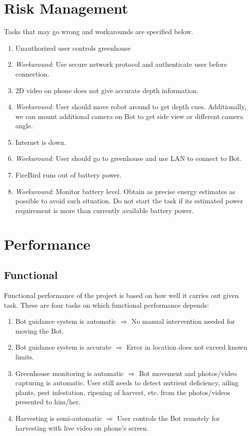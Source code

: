 \documentclass[a4paper, 12pt]{article}
\begin{document}
\section{Risk Management}
Tasks that may go wrong and workarounds are specified below.
\begin{enumerate}
 \item Unauthorized user controls greenhouse
 \item[] \emph{Workaround}: Use secure network protocol and authenticate user before connection.
 \item 2D video on phone does not give accurate depth information.
 \item[] \emph{Workaround}: User should move robot around to get depth cues. Additionally, we can mount additional camera on
 Bot to get side view or different camera angle. 
 \item Internet is down.
 \item[] \emph{Workaround}: User should go to greenhouse and use LAN to connect to Bot.
 \item FireBird runs out of battery power.
 \item[] \emph{Workaround}: Monitor battery level. Obtain as precise energy estimates as possible to avoid such situation.
 Do not start the task if its estimated power requirement is more than currently available battery power.
\end{enumerate}

\section{Performance}
\subsection{Functional}
Functional performance of the project is based on how well it carries out given task. 
These are four tasks on which functional performance depends:
\begin{enumerate}
 \item Bot guidance system is automatic $\Rightarrow$ No manual intervention needed for moving the Bot.
 \item Bot guidance system is accurate $\Rightarrow$ Error in location does not exceed known limits.
 \item Greenhouse monitoring is automatic $\Rightarrow$ Bot movement and photos/video capturing is automatic.
 User still needs to detect nutrient deficiency, ailing plants, pest infestation, ripening of harvest, etc. from
 the photos/videos presented to him/her.
 \item Harvesting is semi-automatic $\Rightarrow$ User controls the Bot remotely for harvesting with live video on phone's screen.
\end{enumerate}
\end{document}
